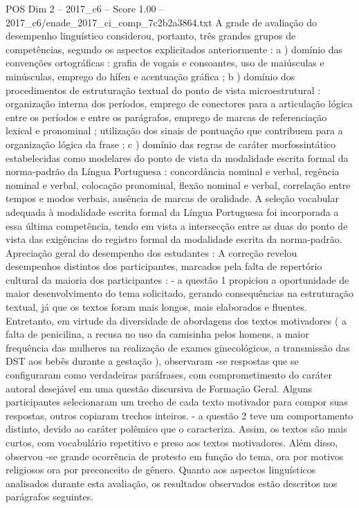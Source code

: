\begin{textsample}{POS Dim 2 – 2017\_c6 – Score 1.00 – 2017\_c6/enade\_2017\_ci\_comp\_7c2b2a3864.txt}
A grade de avaliação do desempenho linguístico considerou, portanto, três grandes grupos de competências, segundo os aspectos explicitados anteriormente : a ) domínio das convenções ortográficas : grafia de vogais e consoantes, uso de maiúsculas e minúsculas, emprego do hífen e acentuação gráfica ; b ) domínio dos procedimentos de estruturação textual do ponto de vista microestrutural : organização interna dos períodos, emprego de conectores para a articulação lógica entre os períodos e entre os parágrafos, emprego de marcas de referenciação lexical e pronominal ; utilização dos sinais de pontuação que contribuem para a organização lógica da frase ; c ) domínio das regras de caráter morfossintático estabelecidas como modelares do ponto de vista da modalidade escrita formal da norma-padrão da Língua Portuguesa : concordância nominal e verbal, regência nominal e verbal, colocação pronominal, flexão nominal e verbal, correlação entre tempos e modos verbais, ausência de marcas de oralidade.
A seleção vocabular adequada à modalidade escrita formal da Língua Portuguesa foi incorporada a essa última competência, tendo em vista a intersecção entre as duas do ponto de vista das exigências do registro formal da modalidade escrita da norma-padrão.
Apreciação geral do desempenho dos estudantes : A correção revelou desempenhos distintos dos participantes, marcados pela falta de repertório cultural da maioria dos participantes : - a questão 1 propiciou a oportunidade de maior desenvolvimento do tema solicitado, gerando consequências na estruturação textual, já que os textos foram mais longos, mais elaborados e fluentes.
Entretanto, em virtude da diversidade de abordagens dos textos motivadores ( a falta de penicilina, a recusa no uso da camisinha pelos homens, a maior frequência das mulheres na realização de exames ginecológicos, a transmissão das DST aos bebês durante a gestação ), observaram -se respostas que se configuraram como verdadeiras paráfrases, com comprometimento do caráter autoral desejável em uma questão discursiva de Formação Geral.
Alguns participantes selecionaram um trecho de cada texto motivador para compor suas respostas, outros copiaram trechos inteiros. - a questão 2 teve um comportamento distinto, devido ao caráter polêmico que o caracteriza.
Assim, os textos são mais curtos, com vocabulário repetitivo e preso aos textos motivadores.
Além disso, observou -se grande ocorrência de protesto em função do tema, ora por motivos religiosos ora por preconceito de gênero.
Quanto aos aspectos linguísticos analisados durante esta avaliação, os resultados observados estão descritos nos parágrafos seguintes.

\end{textsample}
